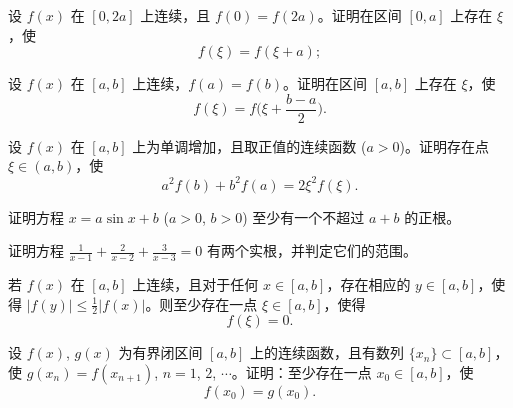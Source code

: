 	\begin{ti}
		\begin{xiaoti}
			\item 设 $f(x)$ 在 $[0,2a]$ 上连续，且 $f(0) = f(2a)$。证明在区间 $[0,a]$ 上存在 $\xi$，使
			\[ f(\xi) = f(\xi + a); \]
			\item 设 $f(x)$ 在 $[a,b]$ 上连续，$f(a) = f(b)$。证明在区间 $[a,b]$ 上存在 $\xi$，使
			\[ f(\xi) = f \biggl( \xi + \frac{b-a}{2} \biggr). \]
		\end{xiaoti}
	\end{ti}

	\begin{ti}
		设 $f(x)$ 在 $[a,b]$ 上为单调增加，且取正值的连续函数 ($a>0$)。证明存在点 $\xi \in (a,b)$，使
		\[ a^2 f(b) + b^2 f(a) = 2 \xi^2 f(\xi). \]
	\end{ti}

	\begin{ti}
		证明方程 $x = a \sin x + b$ ($a>0$, $b>0$) 至少有一个不超过 $a+b$ 的正根。
	\end{ti}

	\begin{ti}
		证明方程 $\frac{1}{x-1} + \frac{2}{x-2} + \frac{3}{x-3} = 0$ 有两个实根，并判定它们的范围。
	\end{ti}

	\begin{ti}
		若 $f(x)$ 在 $[a,b]$ 上连续，且对于任何 $x \in [a,b]$，存在相应的 $y \in [a,b]$，使得 $|f(y)| \leq \frac{1}{2} |f(x)|$。则至少存在一点 $\xi \in [a,b]$，使得
		\[ f(\xi) = 0. \]
	\end{ti}

	\begin{ti}
		设 $f(x)$, $g(x)$ 为有界闭区间 $[a,b]$ 上的连续函数，且有数列 $\{ x_n \} \subset [a,b]$，使 $g(x_n) = f(x_{n+1})$, $n=1$, $2$, $\cdots$。证明：至少存在一点 $x_0 \in [a,b]$，使
		\[ f(x_0) = g(x_0). \]
	\end{ti}